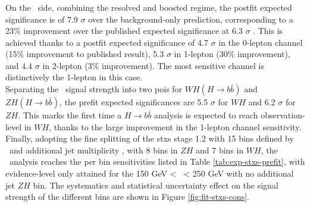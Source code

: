 \subsubsection{\boldvhb}
On the \vhb\ side, combining the resolved and boosted regime, the postfit expected significance is of 7.9 $\sigma$ over the background-only prediction, corresponding to a 23\% improvement over the published expected significance at 6.3 $\sigma$ \cite{ATLAS:2021wqh}. This is achieved thanks to a postfit expected significance of 4.7 $\sigma$ in the 0-lepton channel (15\% improvement to published result), 5.3 $\sigma$ in 1-lepton (30\% improvement), and 4.4 $\sigma$ in 2-lepton (3\% improvement). The most sensitive channel is distinctively the 1-lepton in this case. \\%

Separating the \vhb\ signal strength into two \gls{poi}s for $WH(H \rightarrow{b\bar{b}})$ and $ZH(H \rightarrow{b\bar{b}})$, the prefit expected significances are 5.5 $\sigma$ for $WH$ and 6.2 $\sigma$ for $ZH$. This marks the first time a $H \rightarrow b\bar{b}$ analysis is expected to reach observation-level in $WH$, thanks to the large improvement in the 1-lepton channel sensitivity. \\

Finally, adopting the fine splitting of the \gls{stxs} stage 1.2 with 15 bins defined by \ptv\ and additional jet multiplicity \nj, with 8 bins in $ZH$ and 7 bins in $WH$, the \vhb\ analysis reaches the per bin sensitivities listed in Table \ref{tab:exp-stxs-prefit}, with evidence-level only attained for the 150 GeV < \ptv\ < 250 GeV with no additional jet $ZH$ bin. The systematics and statistical uncertainty effect on the signal strength of the different bins are shown in Figure \ref{fig:fit-stxs-cons}.

